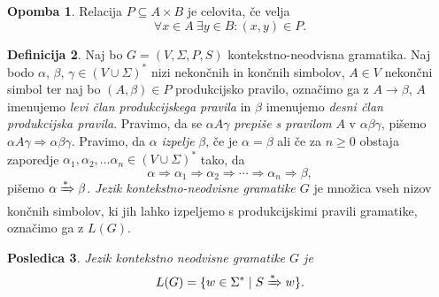 \documentclass{amsart}
\theoremstyle{definition}
\newtheorem{definicija}{Definicija}[section]
\newtheorem{opomba}[definicija]{Opomba}
\theoremstyle{plain} %
\newtheorem{posledica}[definicija]{Posledica}
\begin{document}


\begin{opomba}
    
    Relacija $ P \subseteq A \times B $ je celovita, če velja
    \[
        \forall x \in A \ \exists y \in B \colon (x,y) \in P.
    \]

\end{opomba}

\begin{definicija}
    
    Naj bo $ G = ( V, \Sigma, P, S ) $ kontekstno-neodvisna gramatika. Naj bodo $ \alpha $,
    $ \beta $, $ \gamma \in ( V \cup \Sigma )^* $ nizi nekončnih in končnih simbolov,
    $ A \in V $ nekončni simbol ter naj bo $ ( A, \beta ) \in P $ produkcijsko pravilo,
    označimo ga z $ A \rightarrow \beta $, $ A $ imenujemo \textit{levi član produkcijskega pravila} in $ \beta $
    imenujemo \textit{desni član produkcijska pravila}. Pravimo, da se $ \alpha A \gamma $ 
    \textit{prepiše s pravilom} $ A $ v $ \alpha\beta\gamma $, pišemo $ \alpha A \gamma  \Rightarrow 
    \alpha\beta\gamma $. Pravimo, da $ \alpha $ \textit{izpelje} $ \beta $, če je $ \alpha = \beta $ ali če
    za $ n \geq 0 $ obstaja zaporedje $ \alpha_1, \alpha_2, \ldots \alpha_n
    \in ( V \cup \Sigma )^* $ tako, da 
    \[
        \alpha \Rightarrow \alpha_1 \Rightarrow \alpha_2 \Rightarrow \cdots \Rightarrow \alpha_n
        \Rightarrow \beta,
    \]
    pišemo $ \alpha \xRightarrow{*} \beta $. \textit{Jezik kontekstno-neodvisne gramatike $G$} je množica vseh nizov končnih simbolov,
    ki jih lahko izpeljemo s produkcijskimi pravili gramatike, označimo ga z $ L(G) $.

\end{definicija}

\begin{posledica}

    Jezik kontekstno neodvisne gramatike $G$ je
    \[
        L(G) = \{ w \in \Sigma^* \mid S \xRightarrow{*} w \}.
    \]

\end{posledica}
\end{document}
